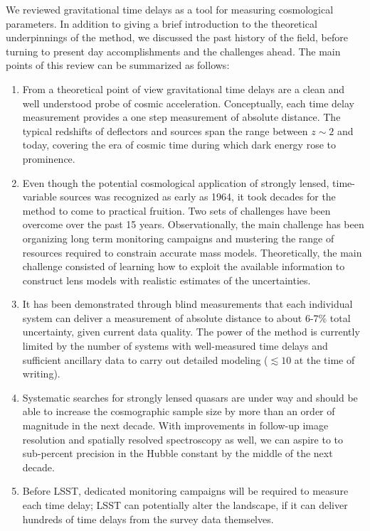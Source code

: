 We reviewed gravitational time delays as a tool for measuring
cosmological parameters. In addition to giving a brief introduction to
the theoretical underpinnings of the method, we discussed the past
history of the field, before turning to present day accomplishments
and the challenges ahead. The main points of this review can be
summarized as follows:

\begin{enumerate}
\item From a theoretical point of view gravitational time delays are a
clean and well understood probe of cosmic acceleration. Conceptually,
each time delay measurement provides a one step measurement of
absolute distance. The typical redshifts of deflectors and sources
span the range between $z\sim2$ and today, covering the era of cosmic
time during which dark energy rose to prominence.
%
\item Even though the potential cosmological application of strongly
lensed, time-variable sources was recognized as early as 1964, it took
decades for the method to come to practical fruition. Two sets of
challenges have been overcome over the past 15 years. Observationally, the
main challenge has been organizing long term monitoring campaigns and
mustering the range of resources required to constrain accurate mass
models. Theoretically, the main challenge consisted of learning how to
exploit the available information to construct lens models with
realistic estimates of the uncertainties.
%
\item It has been demonstrated through blind measurements that each
individual system can deliver a measurement of absolute distance to
about 6-7\% total uncertainty, given current data quality.   The power of
the method is currently limited by the number of systems with
well-measured time delays and sufficient ancillary data to carry out
detailed modeling ($\lesssim10$ at the time of writing).
%
\item Systematic searches for strongly lensed quasars are under way and
should be able to increase the cosmographic sample size by more than
an order of magnitude in the next decade. With improvements in
follow-up image resolution and spatially resolved spectroscopy as
well, we can aspire to to sub-percent precision in the Hubble constant
by the middle of the next decade.
%
\item Before LSST, dedicated monitoring campaigns will be required to
measure each time delay; LSST can potentially alter the landscape, if
it can deliver hundreds of time delays from the survey data themselves.

\end{enumerate}
